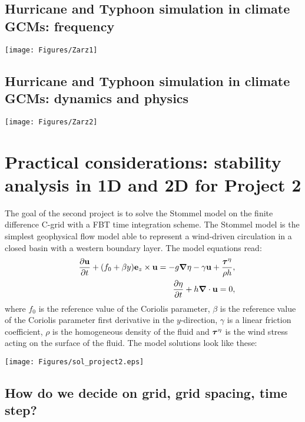 \subsection{Hurricane and Typhoon simulation in climate GCMs: frequency}

	\begin{center}	
		\texttt{[image: Figures/Zarz1]}
	\end{center}
	

\subsection{Hurricane and Typhoon simulation in climate GCMs: dynamics and physics}

	\begin{center}	
		\texttt{[image: Figures/Zarz2]}
	\end{center}
	



\section{Practical considerations: stability analysis in 1D and 2D for Project 2}

The goal of the second project is to solve the Stommel model on the finite difference C-grid with a FBT time integration scheme. The Stommel model is the simplest geophysical flow model able to represent a wind-driven circulation in a closed basin with a western boundary layer. The model equations read:
\begin{eqnarray}
	&&\frac{\partial \mathbf{u}}{\partial t} + (f_0+\beta y) \mathbf{e}_z \times
	\mathbf{u} = -g \mbox{\boldmath $\nabla$} \eta - \gamma \mathbf{u} + \frac{\mbox{\boldmath $\tau$}^{\eta}}{\rho h},\\
	&&\frac{\partial \eta}{\partial t} + h \mbox{\boldmath $\nabla$} \cdot \mathbf{u} = 0,
\end{eqnarray}
where $f_0$ is the reference value of the Coriolis parameter, $\beta$ is the reference value of the Coriolis parameter first derivative in the $y$-direction, $\gamma$ is a linear friction coefficient, $\rho$ is the homogeneous density of the fluid and $\mbox{\boldmath $\tau$}^{\eta}$ is the wind stress acting on the surface of the fluid. The model solutions look like these:
\begin{center}
	\texttt{[image: Figures/sol\_project2.eps]}
\end{center}


\subsection{How do we decide on grid, grid spacing, time step?}

